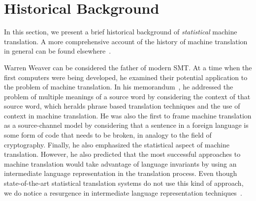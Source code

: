 \section{Historical Background}
\label{sec:historicalBackground}



In this section, we present a brief historical background of \emph{statistical}
machine translation. A more comprehensive account of the history
of machine translation in general can be found
elsewhere~\citep{hutchins:1997:MT,hutchins:2000:MT}.

Warren Weaver can be considered the father of modern SMT.
At a time when the first computers were being developed, he
examined their potential application to the problem of machine
translation. In his memorandum~\citep{weaver:1955:Translation}, he
addressed the problem of multiple meanings of a source word
by considering the context of that source word, which heralds
phrase based translation techniques and the use of context
in machine translation. He was also
the first to frame machine translation as a source-channel
model by considering that a sentence in a foreign language
is some form of code that needs to be broken, in analogy
to the field of cryptography. Finally, he also emphasized the
statistical aspect of machine translation. However, he also
predicted that the most successful approaches to machine
translation would take advantage of language invariants by
using an intermediate language representation in the translation
process. Even though state-of-the-art statistical translation systems do not
use this kind of approach, we do notice a resurgence in intermediate
language representation techniques~\citep{mikolov-le-sutskever:2013:arxiv}.

